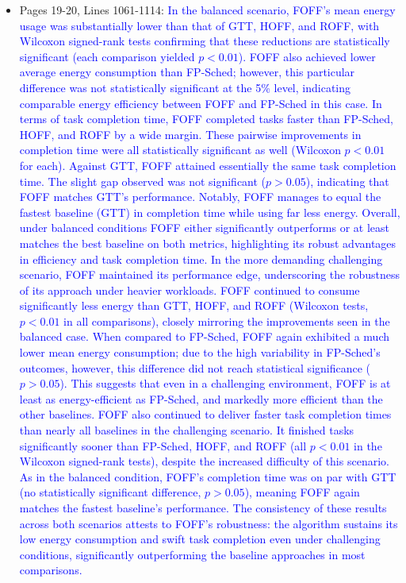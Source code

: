 \begin{itemize}
    \item Pages 19-20, Lines 1061-1114: \textcolor{blue}{In the balanced scenario, FOFF's mean energy usage was substantially lower than that of GTT, HOFF, and ROFF, with Wilcoxon signed-rank tests confirming that these reductions are statistically significant (each comparison yielded $p < 0.01$). FOFF also achieved lower average energy consumption than FP-Sched; however, this particular difference was not statistically significant at the 5\% level, indicating comparable energy efficiency between FOFF and FP-Sched in this case. In terms of task completion time, FOFF completed tasks faster than FP-Sched, HOFF, and ROFF by a wide margin. These pairwise improvements in completion time were all statistically significant as well (Wilcoxon $p < 0.01$ for each). Against GTT, FOFF attained essentially the same task completion time. The slight gap observed was not significant ($p > 0.05$), indicating that FOFF matches GTT's performance. Notably, FOFF manages to equal the fastest baseline (GTT) in completion time while using far less energy. Overall, under balanced conditions FOFF either significantly outperforms or at least matches the best baseline on both metrics, highlighting its robust advantages in efficiency and task completion time. In the more demanding challenging scenario, FOFF maintained its performance edge, underscoring the robustness of its approach under heavier workloads. FOFF continued to consume significantly less energy than GTT, HOFF, and ROFF (Wilcoxon tests, $p < 0.01$ in all comparisons), closely mirroring the improvements seen in the balanced case. When compared to FP-Sched, FOFF again exhibited a much lower mean energy consumption; due to the high variability in FP-Sched's outcomes, however, this difference did not reach statistical significance ($p > 0.05$). This suggests that even in a challenging environment, FOFF is at least as energy-efficient as FP-Sched, and markedly more efficient than the other baselines. FOFF also continued to deliver faster task completion times than nearly all baselines in the challenging scenario. It finished tasks significantly sooner than FP-Sched, HOFF, and ROFF (all $p < 0.01$ in the Wilcoxon signed-rank tests), despite the increased difficulty of this scenario. As in the balanced condition, FOFF's completion time was on par with GTT (no statistically significant difference, $p > 0.05$), meaning FOFF again matches the fastest baseline's performance. The consistency of these results across both scenarios attests to FOFF's robustness: the algorithm sustains its low energy consumption and swift task completion even under challenging conditions, significantly outperforming the baseline approaches in most comparisons.}
\end{itemize}

